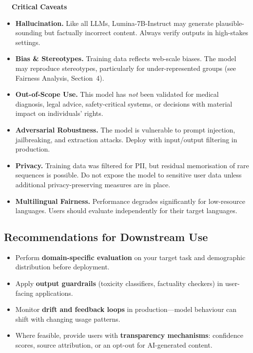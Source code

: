 \documentclass[11pt,a4paper]{article}
\begin{document}
\begin{caveatbox}
  \textbf{\textcolor{warn}{\faExclamationTriangle~~Critical Caveats}}

  \vspace{2pt}
  \begin{itemize}
    \item \textbf{Hallucination.} Like all LLMs, Lumina-7B-Instruct may
    generate plausible-sounding but factually incorrect content. Always verify
    outputs in high-stakes settings.
    \item \textbf{Bias \& Stereotypes.} Training data reflects web-scale biases.
    The model may reproduce stereotypes, particularly for under-represented
    groups (see Fairness Analysis, Section~4).
    \item \textbf{Out-of-Scope Use.} This model has \emph{not} been validated
    for medical diagnosis, legal advice, safety-critical systems, or decisions
    with material impact on individuals' rights.
    \item \textbf{Adversarial Robustness.} The model is vulnerable to prompt
    injection, jailbreaking, and extraction attacks. Deploy with input/output
    filtering in production.
    \item \textbf{Privacy.} Training data was filtered for PII, but residual
    memorisation of rare sequences is possible. Do not expose the model to
    sensitive user data unless additional privacy-preserving measures are in
    place.
    \item \textbf{Multilingual Fairness.} Performance degrades significantly for
    low-resource languages. Users should evaluate independently for their target
    languages.
  \end{itemize}
\end{caveatbox}

\subsection*{Recommendations for Downstream Use}

\begin{itemize}
  \item Perform \textbf{domain-specific evaluation} on your target task and
  demographic distribution before deployment.
  \item Apply \textbf{output guardrails} (toxicity classifiers, factuality
  checkers) in user-facing applications.
  \item Monitor \textbf{drift and feedback loops} in production—model behaviour
  can shift with changing usage patterns.
  \item Where feasible, provide users with \textbf{transparency mechanisms}:
  confidence scores, source attribution, or an opt-out for AI-generated content.
\end{itemize}
\end{document}

